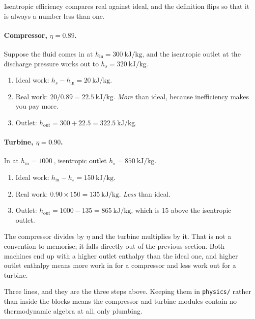\documentclass[11pt,a4paper]{report}
\newcommand{\code}[1]{\texttt{\small #1}}
\begin{document}
Isentropic efficiency compares real against ideal, and the definition flips
so that it is always a number less than one.

\paragraph{Compressor, $\eta = 0.89$.} Suppose the fluid comes in at
$h_{\text{in}} = \SI{300}{\kilo\joule\per\kilogram}$, and the isentropic
outlet at the discharge pressure works out to
$h_s = \SI{320}{\kilo\joule\per\kilogram}$.

\begin{enumerate}\itemsep2pt
\item Ideal work: $h_s - h_{\text{in}} = \SI{20}{\kilo\joule\per\kilogram}$.
\item Real work: $20 / 0.89 = \SI{22.5}{\kilo\joule\per\kilogram}$.
      \emph{More} than ideal, because inefficiency makes you pay more.
\item Outlet: $h_{\text{out}} = 300 + 22.5 =
      \SI{322.5}{\kilo\joule\per\kilogram}$.
\end{enumerate}

\paragraph{Turbine, $\eta = 0.90$.} In at
$h_{\text{in}} = \SI{1000}{}$, isentropic outlet
$h_s = \SI{850}{\kilo\joule\per\kilogram}$.

\begin{enumerate}\itemsep2pt
\item Ideal work: $h_{\text{in}} - h_s = \SI{150}{\kilo\joule\per\kilogram}$.
\item Real work: $0.90 \times 150 = \SI{135}{\kilo\joule\per\kilogram}$.
      \emph{Less} than ideal.
\item Outlet: $h_{\text{out}} = 1000 - 135 = \SI{865}{\kilo\joule\per\kilogram}$,
      which is \SI{15}{} above the isentropic outlet.
\end{enumerate}

The compressor divides by $\eta$ and the turbine multiplies by it. That is
not a convention to memorise; it falls directly out of the previous section.
Both machines end up with a higher outlet enthalpy than the ideal one, and
higher outlet enthalpy means more work in for a compressor and less work out
for a turbine.


\noindent Three lines, and they are the three steps above. Keeping them in
\code{physics/} rather than inside the blocks means the compressor and
turbine modules contain no thermodynamic algebra at all, only plumbing.
\end{document}

